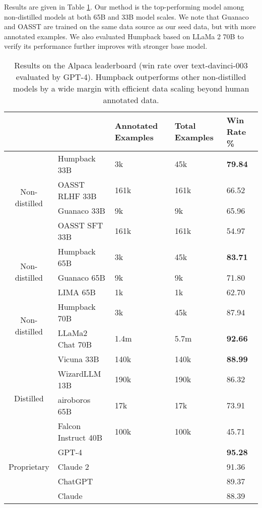 Results are given in Table \ref{tab:alpaca_leaderb}. Our method is the top-performing model among non-distilled models at both 65B and 33B model scales. We note that Guanaco and OASST are trained on the same data source as our seed data, but with more annotated examples. We also evaluated Humpback based on LLaMa 2 \citep{touvron2023llama2} 70B to verify its performance further improves with stronger base model.

\begin{table}[t]
    \caption{
    Results on the Alpaca leaderboard (win rate over text-davinci-003 evaluated by GPT-4). Humpback outperforms other non-distilled models by a wide margin with efficient data scaling beyond human annotated data. 
  \label{tab:alpaca_leaderb}
    }
    \small
  \centering
  \begin{tabular}{cllll}
    \toprule
     &   & \textbf{Annotated Examples} & \textbf{Total Examples} & \textbf{Win Rate \%}  \\
    
    \midrule  
  
   \multirow{4}{4em}{Non-distilled} & Humpback 33B & 3k & 45k & \textbf{79.84} \\

     & OASST RLHF 33B & 161k & 161k & 66.52 \\
     & Guanaco 33B & 9k & 9k & 65.96 \\
    & OASST SFT 33B & 161k & 161k & 54.97 \\
     \midrule
      \multirow{3}{4em}{Non-distilled} & Humpback 65B & 3k & 45k & \bf{83.71} \\
   & Guanaco 65B & 9k & 9k & 71.80 \\
    & LIMA 65B & 1k & 1k & 62.70  \\
     \midrule  
     \multirow{2}{4em}{Non-distilled} & Humpback 70B & 3k & 45k & 87.94 \\
   & LLaMa2 Chat 70B & 1.4m & 5.7m & \bf{92.66} \\
   \midrule
   \multirow{4}{4em}{Distilled}  & Vicuna 33B & 140k & 140k & \bf{88.99} \\
    & WizardLLM 13B & 190k & 190k & 86.32 \\
    & airoboros 65B & 17k & 17k & 73.91 \\
     & Falcon Instruct 40B & 100k & 100k & 45.71 \\
   
     \midrule
  \multirow{3}{4em}{Proprietary} & GPT-4 & & & \bf{95.28} \\
   & Claude 2 & & & 91.36 \\
   & ChatGPT & &  & 89.37 \\ %
   & Claude & & & 88.39 \\
    \bottomrule
  \end{tabular}
\end{table}

